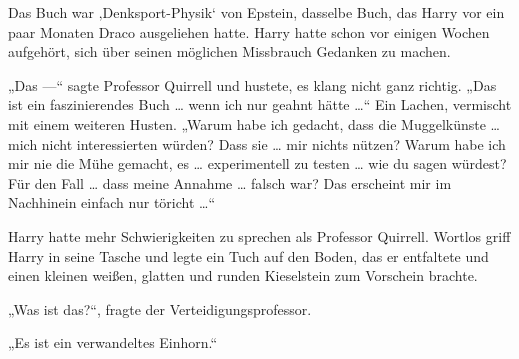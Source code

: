 Das Buch war ‚Denksport-Physik‘ von Epstein, dasselbe Buch, das Harry vor ein paar Monaten Draco ausgeliehen hatte. Harry hatte schon vor einigen Wochen aufgehört, sich über seinen möglichen Missbrauch Gedanken zu machen.

„Das —“
sagte Professor Quirrell und hustete, es klang nicht ganz richtig.
„Das ist ein faszinierendes Buch … wenn ich nur geahnt hätte …“
Ein Lachen, vermischt mit einem weiteren Husten.
„Warum habe ich gedacht, dass die Muggelkünste … mich nicht interessierten würden? Dass sie … mir nichts nützen? Warum habe ich mir nie die Mühe gemacht, es … experimentell zu testen … wie du sagen würdest? Für den Fall … dass meine Annahme … falsch war? Das erscheint mir im Nachhinein einfach nur töricht …“

Harry hatte mehr Schwierigkeiten zu sprechen als Professor Quirrell. Wortlos griff Harry in seine Tasche und legte ein Tuch auf den Boden, das er entfaltete und einen kleinen weißen, glatten und runden Kieselstein zum Vorschein brachte.

„Was ist das?“, fragte der Verteidigungsprofessor.

„Es ist ein verwandeltes Einhorn.“

